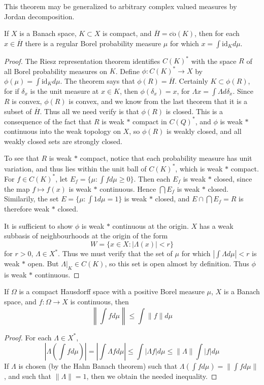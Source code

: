 This theorem may be generalized to arbitrary complex valued measures by Jordan decomposition.

\begin{theorem}
    If $X$ is a Banach space, $K \subset X$ is compact, and $\overline{H} = \overline{\text{co}}(K)$, then for each $x \in \overline{H}$ there is a regular Borel probability measure $\mu$ for which $x = \int \text{id}_K d\mu$.
\end{theorem}
\begin{proof}
    The Riesz representation theorem identifies $C(K)^*$ with the space $R$ of all Borel probability measures on $K$. Define $\phi: C(K)^* \to X$ by $\phi(\mu) = \int \text{id}_K d\mu$. The theorem says that $\phi(R) = \overline{H}$. Certainly $K \subset \phi(R)$, for if $\delta_x$ is the unit measure at $x \in K$, then $\phi(\delta_x) = x$, for $\Lambda x = \int \Lambda d \delta_x$. Since $R$ is convex, $\phi(R)$ is convex, and we know from the last theorem that it is a subset of $\overline{H}$. Thus all we need verify is that $\phi(R)$ is closed. This is a consequence of the fact that $R$ is weak $*$ compact in $C(Q)^*$, and $\phi$ is weak $*$ continuous into the weak topology on $X$, so $\phi(R)$ is weakly closed, and all weakly closed sets are strongly closed.

    To see that $R$ is weak $*$ compact, notice that each probability measure has unit variation, and thus lies within the unit ball of $C(K)^*$, which is weak $*$ compact. For $f \in C(K)^*$, let $E_f = \{ \mu : \int f d\mu \geq 0 \}$. Then each $E_f$ is weak $*$ closed, since the map $f \mapsto f(x)$ is weak $*$ continuous. Hence $\bigcap E_f$ is weak $*$ closed. Similarily, the set $E = \{ \mu : \int 1 d\mu = 1 \}$ is weak $*$ closed, and $E \cap \bigcap E_f = R$ is therefore weak $*$ closed.

    It is sufficient to show $\phi$ is weak $*$ continuous at the origin. $X$ has a weak subbasis of neighbourhoods at the origin of the form
    \[ W = \{ x \in X : |\Lambda(x)| < r \} \]
    for $r > 0$, $\Lambda \in X^*$. Thus we must verify that the set of $\mu$ for which $\left| \int \Lambda d\mu \right| < r$ is weak $*$ open. But $\Lambda|_K \in C(K)$, so this set is open almost by definition. Thus $\phi$ is weak $*$ continuous.
\end{proof}

\begin{theorem}
    If $\Omega$ is a compact Hausdorff space with a positive Borel measure $\mu$, $X$ is a Banach space, and $f: \Omega \to X$ is continuous, then
    \[ \left\| \int f d\mu \right\| \leq \int \| f \| d\mu \]
\end{theorem}
\begin{proof}
    For each $\Lambda \in X^*$,
    \[ \left| \Lambda\left(\int f d\mu\right) \right| = \left| \int \Lambda f d\mu \right| \leq \int | \Lambda f | d\mu \leq \| \Lambda \| \int | f | d\mu \]
    If $\Lambda$ is chosen (by the Hahn Banach theorem) such that $\Lambda(\int f d\mu) = \| \int f d\mu \|$, and such that $\| \Lambda \| = 1$, then we obtain the needed inequality.
\end{proof}

